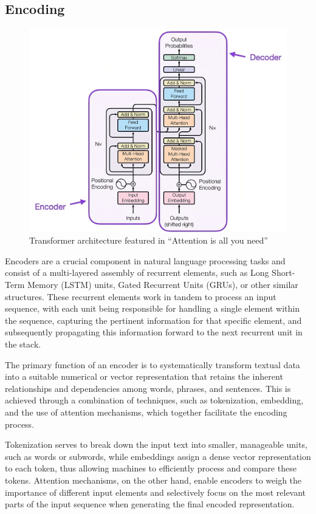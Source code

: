 \subsection{Encoding}
\label{sec:encoders}


\begin{figure}[H]
    \centering
    \includegraphics[width=0.8\linewidth]{pics/transformer-4x.jpg}
    \caption{Transformer architecture featured in “Attention is all you need” \cite{https://doi.org/10.48550/arxiv.1706.03762}}
    \label{fig:transformer}
\end{figure}

Encoders\cite{kumar2022deep} are a crucial component in natural language processing tasks and consist of a multi-layered assembly of recurrent elements, such as Long Short-Term Memory (LSTM) units, Gated Recurrent Units (GRUs), or other similar structures. These recurrent elements work in tandem to process an input sequence, with each unit being responsible for handling a single element within the sequence, capturing the pertinent information for that specific element, and subsequently propagating this information forward to the next recurrent unit in the stack.

The primary function of an encoder is to systematically transform textual data into a suitable numerical or vector representation that retains the inherent relationships and dependencies among words, phrases, and sentences\cite{cho-etal-2014-learning}. This is achieved through a combination of techniques, such as tokenization, embedding, and the use of attention mechanisms, which together facilitate the encoding process.

Tokenization serves to break down the input text into smaller, manageable units, such as words or subwords, while embeddings assign a dense vector representation to each token, thus allowing machines to efficiently process and compare these tokens. Attention mechanisms, on the other hand, enable encoders to weigh the importance of different input elements and selectively focus on the most relevant parts of the input sequence when generating the final encoded representation.

